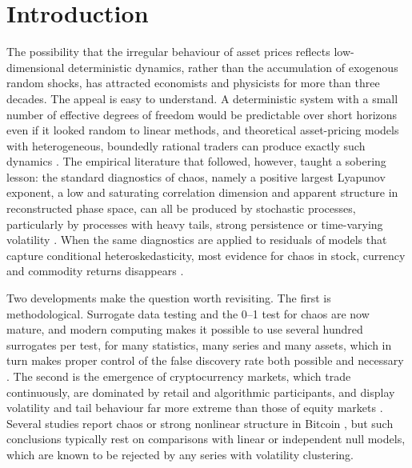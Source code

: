 \documentclass[11pt,a4paper]{article}
\begin{document}
\section{Introduction}

The possibility that the irregular behaviour of asset prices reflects low-dimensional deterministic dynamics,
rather than the accumulation of exogenous random shocks, has attracted economists and physicists for more than
three decades. The appeal is easy to understand. A deterministic system with a small number of effective degrees of
freedom would be predictable over short horizons even if it looked random to linear methods, and theoretical
asset-pricing models with heterogeneous, boundedly rational traders can produce exactly such dynamics
\citep{BrockHommes1998}. The empirical literature that followed, however, taught a sobering lesson: the standard
diagnostics of chaos, namely a positive largest Lyapunov exponent, a low and saturating correlation dimension and
apparent structure in reconstructed phase space, can all be produced by stochastic processes, particularly by
processes with heavy tails, strong persistence or time-varying volatility
\citep{OsborneProvenzale1989,Ruelle1990,EckmannRuelle1992}. When the same diagnostics are applied to residuals of
models that capture conditional heteroskedasticity, most evidence for chaos in stock, currency and commodity
returns disappears \citep{Hsieh1989,Hsieh1991,BrockHsiehLeBaron1991}.

Two developments make the question worth revisiting. The first is methodological. Surrogate data testing
\citep{Theiler1992,SchreiberSchmitz1996,SchreiberSchmitz2000,Lancaster2018} and the 0--1 test for chaos
\citep{GottwaldMelbourne2004,GottwaldMelbourne2009} are now mature, and modern computing makes it possible to
use several hundred surrogates per test, for many statistics, many series and many assets, which in turn makes
proper control of the false discovery rate both possible and necessary \citep{BenjaminiHochberg1995,Harvey2016}.
The second is the emergence of cryptocurrency markets, which trade continuously, are dominated by retail and
algorithmic participants, and display volatility and tail behaviour far more extreme than those of equity
markets \citep{Corbet2019}. Several studies report chaos or strong nonlinear structure in Bitcoin
\citep{LahmiriBekiros2018}, but such conclusions typically rest on comparisons with linear or independent null
models, which are known to be rejected by any series with volatility clustering.
\end{document}

